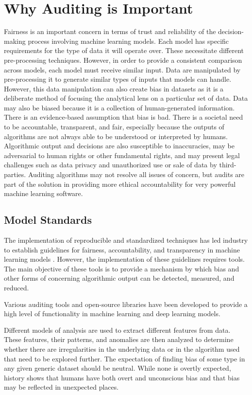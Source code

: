\documentclass[conference]{IEEEtran}
\begin{document}
\section{Why Auditing is Important}
Fairness is an important concern in terms of trust and reliability of the decision-making process involving machine learning models. Each model has specific requirements for the type of data it will operate over. These necessitate different pre-processing techniques. However, in order to provide a consistent comparison across models, each model must receive similar input. Data are manipulated by pre-processing it to generate similar types of inputs that models can handle. However, this data manipulation can also create bias in datasets as it is a deliberate method of focusing the analytical lens on a particular set of data. Data may also be biased because it is a collection of human-generated information.
There is an evidence-based assumption that bias is bad. There is a societal need to be accountable, transparent, and fair, especially because the outputs of algorithms are not always able to be understood or interpreted by humans. Algorithmic output and decisions are also susceptible to inaccuracies, may be adversarial to human rights or other fundamental rights, and may present legal challenges such as data privacy and unauthorized use or sale of data by third-parties. Auditing algorithms may not resolve all issues of concern, but audits are part of the solution in providing more ethical accountability for very powerful machine learning software.

\subsection{Model Standards}
The implementation of reproducible and standardized techniques has led industry to establish guidelines for fairness, accountability, and transparency in machine learning models \cite{b2}. However, the implementation of these guidelines requires tools. The main objective of these tools is to provide a mechanism by which bias and other forms of concerning algorithmic output can be detected, measured, and reduced.

Various auditing tools and open-source libraries have been developed to provide a high level of functionality in machine learning and deep learning models.

Different models of analysis are used to extract different features from data. These features, their patterns, and anomalies are then analyzed to determine whether there are irregularities in the underlying data or in the algorithm used that need to be explored further.
The expectation of finding bias of some type in any given generic dataset should be neutral. While none is overtly expected, history shows that humans have both overt and unconscious bias and that bias may be reflected in unexpected places.
\end{document}
